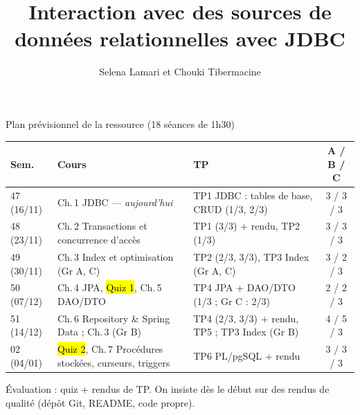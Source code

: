 \documentclass[aspectratio=169,10pt]{beamer}
\title{Interaction avec des sources de donn\'ees relationnelles avec JDBC}
\author[C. Tibermacine]{Selena Lamari et Chouki Tibermacine}
\date{}
\begin{document}
	

\begin{frame}{Plan pr\'evisionnel de la ressource (18 s\'eances de 1h30)}
  \begin{datacard}
    \scriptsize
    \renewcommand{\arraystretch}{1.05}
    \begin{tabular}{@{}lp{4.9cm}p{5.1cm}c@{}}
      \toprule
      \textbf{Sem.} & \textbf{Cours} & \textbf{TP} & \textbf{A / B / C}\\
      \midrule
      47 (16/11) & Ch.\,1 JDBC --- \emph{aujourd'hui} & TP1 JDBC : tables de base, CRUD (1/3, 2/3) & 3 / 3 / 3\\
      48 (23/11) & Ch.\,2 Transactions et concurrence d'acc\`es & TP1 (3/3) + rendu, TP2 (1/3) & 3 / 3 / 3\\
      49 (30/11) & Ch.\,3 Index et optimisation (Gr A, C) & TP2 (2/3, 3/3), TP3 Index (Gr A, C) & 3 / 2 / 3\\
      50 (07/12) & Ch.\,4 JPA, \hl{Quiz 1}, Ch.\,5 DAO/DTO & TP4 JPA + DAO/DTO (1/3 ; Gr C : 2/3) & 2 / 2 / 3\\
      51 (14/12) & Ch.\,6 Repository \& Spring Data ; Ch.\,3 (Gr B) & TP4 (2/3, 3/3) + rendu, TP5 ; TP3 Index (Gr B) & 4 / 5 / 3\\
      02 (04/01) & \hl{Quiz 2}, Ch.\,7 Proc\'edures stock\'ees, curseurs, triggers & TP6 PL/pgSQL + rendu & 3 / 3 / 3\\
      \bottomrule
    \end{tabular}
  \end{datacard}
  \vspace{2mm}
  {\small\color{qamuted} \'Evaluation : quiz + rendus de TP. On insiste d\`es le d\'ebut sur des \alert{rendus de qualit\'e} (d\'ep\^ot Git, README, code propre).}
\end{frame}
\end{document}
